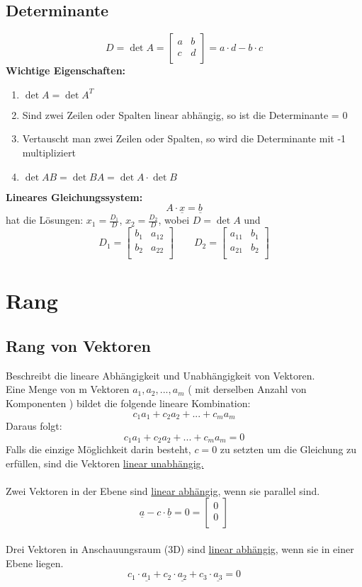 \subsection*{Determinante}
\[
	D = \det{A}=
	\begin{bmatrix}
	a & b  \\
	c & d  \\
	\end{bmatrix}
	=a \cdot d - b \cdot c
\]
\textbf{Wichtige Eigenschaften:}
\begin{enumerate}
	\item $\det{A} = \det{A^T}$
	\item Sind zwei Zeilen oder Spalten linear abhängig, so ist die Determinante = 0
	\item Vertauscht man zwei Zeilen oder Spalten, so wird die Determinante mit -1 multipliziert
	\item $\det{AB} = \det{BA} = \det{A} \cdot \det{B}$
\end{enumerate}
\textbf{Lineares Gleichungssystem:}
\[
	A \cdot \underline{x} = \underline{b}
\]
hat die Lösungen: $x_1 = \frac{D_1}{D}$, $x_2 = \frac{D_2}{D}$, wobei $D = \det{A}$ und
\[
	D_1 = 
	\begin{bmatrix}
		b_1 & a_{12} \\
		b_2 & a_{22} \\
	\end{bmatrix} \qquad
	D_2 = 
	\begin{bmatrix}
		a_{11} & b_1 \\
		a_{21} & b_2 \\
	\end{bmatrix}
\]

\section{Rang}
\subsection{Rang von Vektoren}
Beschreibt die lineare Abhängigkeit und Unabhängigkeit von Vektoren.
\\
Eine Menge von m Vektoren $a_1,a_2,...,a_m$ ( mit derselben Anzahl von Komponenten ) bildet die folgende lineare Kombination:
\[
	c_1a_1+c_2a_2+...+c_ma_m
\]
Daraus folgt:
\[
	c_1a_1+c_2a_2+...+c_ma_m=0
\]
Falls die einzige Möglichkeit darin besteht, $c=0$ zu setzten um die Gleichung zu erfüllen, sind die Vektoren \underline{linear unabhängig.}
\\
\\
Zwei Vektoren in der Ebene sind \underline{linear abhängig}, wenn sie parallel sind.
\[
	\underline{a}-c\cdot\underline{b}=0=\begin{bmatrix}
	0  \\
	0  \\
	\end{bmatrix}
\]
\\
Drei Vektoren in Anschauungsraum (3D) sind \underline{linear abhängig}, wenn sie in einer Ebene liegen.
\[
	c_1\cdot\underline{a_1}+c_2\cdot\underline{a_2}+c_3\cdot\underline{a_3}=0
\]

